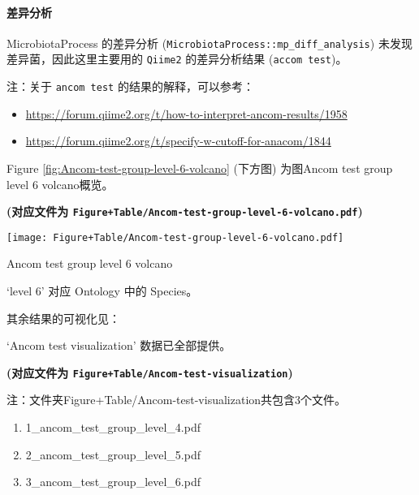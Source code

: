 \documentclass[
]{article}
\providecommand{\tightlist}{%
  \setlength{\itemsep}{0pt}\setlength{\parskip}{0pt}}
\begin{document}
\hypertarget{ux5deeux5f02ux5206ux6790}{%
\paragraph{差异分析}\label{ux5deeux5f02ux5206ux6790}}

MicrobiotaProcess 的差异分析 (\texttt{MicrobiotaProcess::mp\_diff\_analysis}) 未发现差异菌，因此这里主要用的
\texttt{Qiime2} 的差异分析结果 (\texttt{accom\ test})。

注：关于 \texttt{ancom\ test} 的结果的解释，可以参考：

\begin{itemize}
\tightlist
\item
  \url{https://forum.qiime2.org/t/how-to-interpret-ancom-results/1958}
\item
  \url{https://forum.qiime2.org/t/specify-w-cutoff-for-anacom/1844}
\end{itemize}

Figure \ref{fig:Ancom-test-group-level-6-volcano} (下方图) 为图Ancom test group level 6 volcano概览。

\textbf{(对应文件为 \texttt{Figure+Table/Ancom-test-group-level-6-volcano.pdf})}

\def\@captype{figure}
\begin{center}
\texttt{[image: Figure+Table/Ancom-test-group-level-6-volcano.pdf]}
\caption{Ancom test group level 6 volcano}\label{fig:Ancom-test-group-level-6-volcano}
\end{center}

`level 6' 对应 Ontology 中的 Species。

其余结果的可视化见：

`Ancom test visualization' 数据已全部提供。

\textbf{(对应文件为 \texttt{Figure+Table/Ancom-test-visualization})}

\begin{center}\begin{tcolorbox}[colback=gray!10, colframe=gray!50, width=0.9\linewidth, arc=1mm, boxrule=0.5pt]注：文件夹Figure+Table/Ancom-test-visualization共包含3个文件。

\begin{enumerate}\tightlist
\item 1\_ancom\_test\_group\_level\_4.pdf
\item 2\_ancom\_test\_group\_level\_5.pdf
\item 3\_ancom\_test\_group\_level\_6.pdf
\end{enumerate}\end{tcolorbox}
\end{center}
\end{document}
